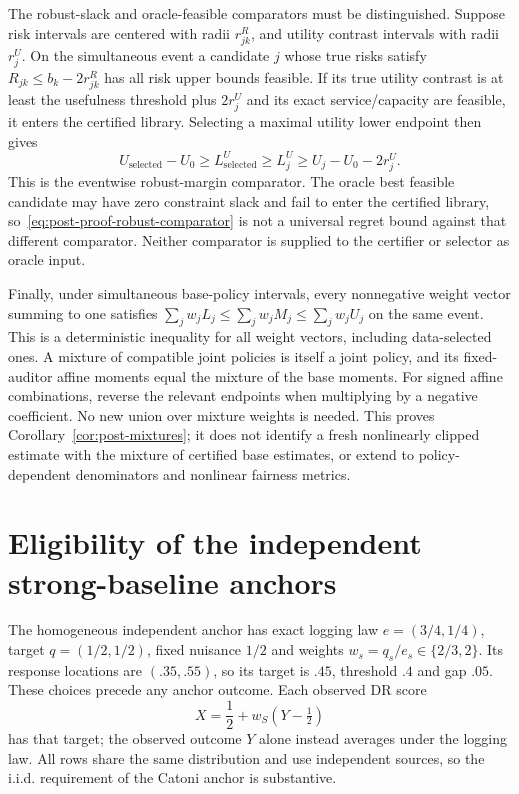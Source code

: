 The robust-slack and oracle-feasible comparators must be distinguished.
Suppose risk intervals are centered with radii $r^R_{jk}$, and utility contrast
intervals with radii $r^U_j$. On the simultaneous event a candidate $j$ whose
true risks satisfy $R_{jk}\leq b_k-2r^R_{jk}$ has all risk upper bounds feasible.
If its true utility contrast is at least the usefulness threshold plus
$2r^U_j$ and its exact service/capacity are feasible, it enters the certified
library. Selecting a maximal utility lower endpoint then gives
\begin{equation}
 U_{\mathrm{selected}}-U_0
 \geq L^U_{\mathrm{selected}}\geq L^U_j
 \geq U_j-U_0-2r^U_j.
 \label{eq:post-proof-robust-comparator}
\end{equation}
This is the eventwise robust-margin comparator. The oracle best feasible
candidate may have zero constraint slack and fail to enter the certified
library, so~\eqref{eq:post-proof-robust-comparator} is not a universal regret
bound against that different comparator. Neither comparator is supplied to
the certifier or selector as oracle input.

Finally, under simultaneous base-policy intervals, every nonnegative weight
vector summing to one satisfies
$\sum_jw_jL_j\leq\sum_jw_jM_j\leq\sum_jw_jU_j$ on the same event. This is a
deterministic inequality for all weight vectors, including data-selected ones.
A mixture of compatible joint policies is itself a joint policy, and its fixed-
auditor affine moments equal the mixture of the base moments. For signed
affine combinations, reverse the relevant endpoints when multiplying by a
negative coefficient. No new union over mixture weights is needed.
This proves Corollary~\ref{cor:post-mixtures}; it does not identify a fresh
nonlinearly clipped estimate with the mixture of certified base estimates,
or extend to policy-dependent denominators and nonlinear fairness metrics.

\section{Eligibility of the independent strong-baseline anchors}
\label{app:post-iid-anchor}

The homogeneous independent anchor has exact logging law
$e=(3/4,1/4)$, target $q=(1/2,1/2)$, fixed nuisance $1/2$ and weights
$w_s=q_s/e_s\in\{2/3,2\}$. Its response locations are $(.35,.55)$, so its
target is $.45$, threshold $.4$ and gap $.05$. These choices precede any
anchor outcome. Each observed DR score
\[
 X=\frac 12+w_S(Y-\tfrac 12)
\]
has that target; the observed outcome $Y$ alone instead averages under the
logging law. All rows share the same distribution and use independent
sources, so the i.i.d. requirement of the Catoni anchor is substantive.

